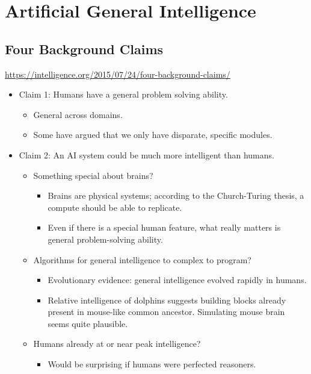 
\chapter{Artificial General Intelligence}

\section{Four Background Claims}

\noindent\url{https://intelligence.org/2015/07/24/four-background-claims/}

\begin{itemize}
    \item Claim 1: Humans have a general problem solving ability.
    \begin{itemize}
        \item General across domains.
        \item Some have argued that we only have disparate, specific modules.
    \end{itemize}
    \item Claim 2: An AI system could be much more intelligent than humans.
    \begin{itemize}
        \item Something special about brains?
        \begin{itemize}
            \item Brains are physical systems; according to the Church-Turing thesis, a compute should be able to replicate.
            \item Even if there is a special human feature, what really matters is general problem-solving ability.
        \end{itemize}
        \item Algorithms for general intelligence to complex to program?
        \begin{itemize}
            \item Evolutionary evidence: general intelligence evolved rapidly in humans.
            \item Relative intelligence of dolphins suggests building blocks already present in mouse-like common ancestor. Simulating mouse brain seems quite plausible.
        \end{itemize}
        \item Humans already at or near peak intelligence?
        \begin{itemize}
            \item Would be surprising if humans were perfected reasoners.

\end{itemize}
\end{itemize}
\end{itemize}
